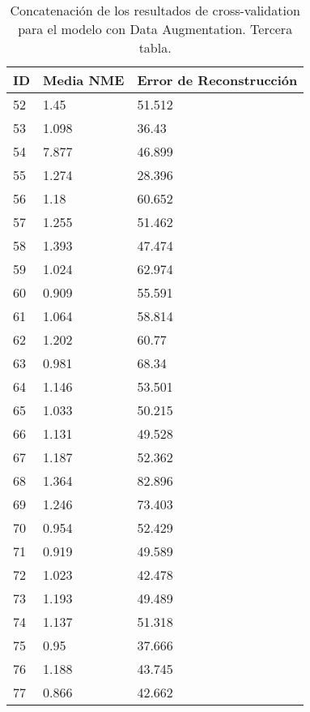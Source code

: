 \begin{table}[!ht]
    \centering
    \caption{Concatenación de los resultados de cross-validation para el modelo con Data Augmentation. Tercera tabla.}
    \begin{tabular}{|l|l|l|}
    \hline
    \cellcolor{gray!25}\textbf{ID} & \cellcolor{gray!25}\textbf{Media NME} & \cellcolor{gray!25}\textbf{Error de Reconstrucción} \\ \hline
        52 & 1.45 & 51.512 \\ \hline
        53 & 1.098 & 36.43 \\ \hline
        54 & 7.877 & 46.899 \\ \hline
        55 & 1.274 & 28.396 \\ \hline
        56 & 1.18 & 60.652 \\ \hline
        57 & 1.255 & 51.462 \\ \hline
        58 & 1.393 & 47.474 \\ \hline
        59 & 1.024 & 62.974 \\ \hline
        60 & 0.909 & 55.591 \\ \hline
        61 & 1.064 & 58.814 \\ \hline
        62 & 1.202 & 60.77 \\ \hline
        63 & 0.981 & 68.34 \\ \hline
        64 & 1.146 & 53.501 \\ \hline
        65 & 1.033 & 50.215 \\ \hline
        66 & 1.131 & 49.528 \\ \hline
        67 & 1.187 & 52.362 \\ \hline
        68 & 1.364 & 82.896 \\ \hline
        69 & 1.246 & 73.403 \\ \hline
        70 & 0.954 & 52.429 \\ \hline
        71 & 0.919 & 49.589 \\ \hline
        72 & 1.023 & 42.478 \\ \hline
        73 & 1.193 & 49.489 \\ \hline
        74 & 1.137 & 51.318 \\ \hline
        75 & 0.95 & 37.666 \\ \hline
        76 & 1.188 & 43.745 \\ \hline
        77 & 0.866 & 42.662 \\ \hline
    \end{tabular}
\end{table}


